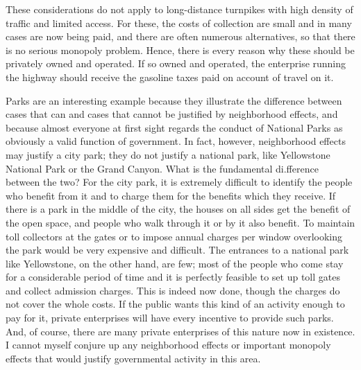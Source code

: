 \documentclass[11pt,openany]{book}
\begin{document}
These considerations do not apply to long-distance turnpikes with high density of traffic and limited access. For these, the costs of collection are small and in many cases are now being paid, and there are often numerous alternatives, so that there is no serious monopoly problem. Hence, there is every reason why these should be privately owned and operated. If so owned and operated, the enterprise running the highway should receive the gasoline taxes paid on account of travel on it.

Parks are an interesting example because they illustrate the difference between cases that can and cases that cannot be justified by neighborhood effects, and because almost everyone at first sight regards the conduct of National Parks as obviously a valid function of government. In fact, however, neighborhood effects may justify a city park; they do not justify a national park, like Yellowstone National Park or the Grand Canyon. What is the fundamental di.fference between the two? For the city park, it is extremely difficult to identify the people who benefit from it and to charge them for the benefits which they receive. If there is a park in the middle of the city, the houses on all sides get the benefit of the open space, and people who walk through it or by it also benefit. To maintain toll collectors at the gates or to impose annual charges per window overlooking the park would be very expensive and difficult. The entrances to a national park like Yellowstone, on the other hand, are few; most of the people who come stay for a considerable period of time and it is perfectly feasible to set up toll gates and collect admission charges. This is indeed now done, though the charges do not cover the whole costs. If the public wants this kind of an activity enough to pay for it, private enterprises will have every incentive to provide such parks. And, of course, there are many private enterprises of this nature now in existence. I cannot myself conjure up any neighborhood effects or important monopoly effects that would justify governmental activity in this area.
\end{document}
